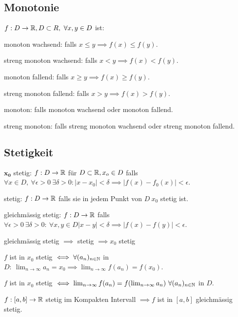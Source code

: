 \subsection{Monotonie}
$f : D \to \mathbb{R}, D \subset R, \ \forall x,y \in D$ ist:
\begin{compactdesc}
    \item[monoton wachsend:] falls $x \le y \implies f(x) \le f(y)$.
    \item[streng monoton wachsend:] falls $x < y \implies f(x) < f(y)$.
    \item[monoton fallend:] falls $x \ge y \implies f(x) \ge f(y)$.
    \item[streng monoton fallend:] falls $x > y \implies f(x) > f(y)$.
    \item[monoton:] falls monoton wachsend oder monoton fallend.
    \item[streng monoton:] falls streng monoton wachsend oder streng monoton fallend.
\end{compactdesc}

\subsection{Stetigkeit}
\begin{compactdesc}
    \item[$\mathbf{x_0}$ stetig:] $f: D \to \mathbb{R}$ für $D \subset \mathbb{R}, x_o \in D$  falls  $\forall x \in D, \ \forall \epsilon > 0 \ \exists \delta > 0: \left| x - x_0 \right| < \delta \implies \left| f(x) - f_0(x) \right| < \epsilon$.
    \item[stetig:] $f: D \to \mathbb{R}$ falls sie in jedem Punkt von $D \ x_0$ stetig ist.
    \item[gleichmässig stetig:] $f:D \to \mathbb{R}$ falls $\forall \epsilon > 0 \ \exists \delta > 0: \ \forall x, y \in D \left| x -y \right| < \delta \implies \left| f(x) - f(y) \right| < \epsilon$.
\end{compactdesc}

\begin{compactitem}
    \item gleichmässig stetig $\implies$ stetig $\implies x_0$ stetig
    \item $f$ ist in $x_0$ stetig $\iff \forall (a_n)_{n \in \mathbb{N}}$ in $D: \ \lim_{n \to \infty} a_n = x_0 \implies \lim_{n \to \infty} f(a_n) = f(x_0)$.
        \begin{compactitem}
            \item $f$ ist in $x_0$ stetig $\iff \lim_{n \to \infty} f(a_n) = f( \lim_{n \to \infty} a_n) \ \forall (a_n)_{n \in \mathbb{N}}$ in $D$.
        \end{compactitem}
    \item $f: [a, b] \to \mathbb{R}$ stetig im Kompakten Intervall $\implies f$ ist in $[a,b]$ gleichmässig stetig.
\end{compactitem}

